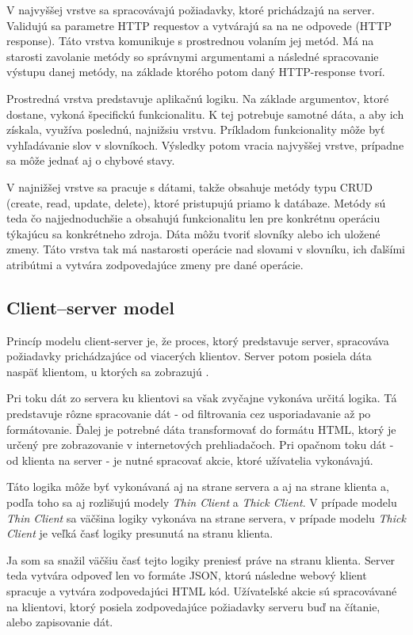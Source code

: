 \documentclass[
  digital, %
  table,   %
  lof,     %
  lot,     %
]{fithesis3}
\begin{document}
V najvyššej vrstve sa spracovávajú požiadavky, ktoré prichádzajú na server. Validujú sa parametre HTTP requestov a vytvárajú sa na ne odpovede (HTTP response). Táto vrstva komunikuje s prostrednou volaním jej metód. Má na starosti zavolanie metódy so správnymi argumentami a následné spracovanie výstupu danej metódy, na základe ktorého potom daný HTTP-response tvorí.

Prostredná vrstva predstavuje aplikačnú logiku. Na základe argumentov, ktoré dostane, vykoná špecifickú funkcionalitu. K tej potrebuje samotné dáta, a aby ich získala, využíva poslednú, najnižsiu vrstvu. Príkladom funkcionality môže byť vyhľadávanie slov v slovníkoch. Výsledky potom vracia najvyššej vrstve, prípadne sa môže jednať aj o chybové stavy.

V najnižšej vrstve sa pracuje s dátami, takže obsahuje metódy typu CRUD (create, read, update, delete), ktoré pristupujú priamo k datábaze. Metódy sú teda čo najjednoduchšie a obsahujú funkcionalitu len pre konkrétnu operáciu týkajúcu sa konkrétneho zdroja. Dáta môžu tvoriť slovníky alebo ich uložené zmeny. Táto vrstva tak má nastarosti operácie nad slovami v slovníku, ich ďalšími atribútmi a vytvára zodpovedajúce zmeny pre dané operácie.

\subsection{Client–server model}
Princíp modelu client-server je, že proces, ktorý predstavuje server, spracováva požiadavky prichádzajúce od viacerých klientov. Server potom posiela dáta naspäť klientom, u ktorých sa zobrazujú \parencite{hanson2000client}.

Pri toku dát zo servera ku klientovi sa však zvyčajne vykonáva určitá logika. Tá predstavuje rôzne spracovanie dát - od filtrovania cez usporiadavanie až po formátovanie. Ďalej je potrebné dáta transformovať do formátu HTML, ktorý je určený pre zobrazovanie v internetových prehliadačoch. Pri opačnom toku dát - od klienta na server - je nutné spracovať akcie, ktoré užívatelia vykonávajú.

Táto logika môže byť vykonávaná aj na strane servera a aj na strane klienta a, podľa toho sa aj rozlišujú modely \textit{Thin Client} a \textit{Thick Client}. V prípade modelu \textit{Thin Client} sa väčšina logiky vykonáva na strane servera, v prípade modelu \textit{Thick Client} je veľká časť logiky presunutá na stranu klienta.

Ja som sa snažil väčšiu časť tejto logiky preniesť práve na stranu klienta. Server teda vytvára odpoveď len vo formáte JSON, ktorú následne webový klient spracuje a vytvára zodpovedajúci HTML kód. Užívateľské akcie sú spracovávané na klientovi, ktorý posiela zodpovedajúce požiadavky serveru buď na čítanie, alebo zapisovanie dát.
\end{document}

